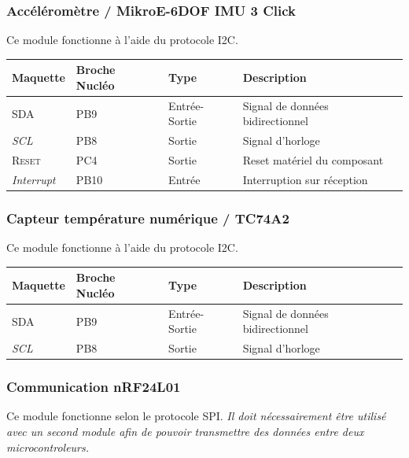 \documentclass[a4paper,11pt,titlepage]{article} %
\begin{document}
\subsubsection{Accéléromètre / MikroE-6DOF IMU 3 Click}

Ce module fonctionne à l'aide du protocole I2C.

\begin{center}
\begin{tabular}{|l|l|l|l|}
\hline 
Maquette & \textbf{Broche Nucléo} & Type & Description \\ 
\hline 
\textsc{SDA} & PB9 & Entrée-Sortie & Signal de données bidirectionnel \\ 
\textit{SCL} & PB8 & Sortie & Signal d'horloge\\
\hline 
\textsc{Reset} & PC4 & Sortie & Reset matériel du composant\\ 
\textit{Interrupt} & PB10 & Entrée & Interruption sur réception\\ 
\hline 
\end{tabular} 
\end{center}

\subsubsection{Capteur température numérique / TC74A2}

Ce module fonctionne à l'aide du protocole I2C.

\begin{center}
\begin{tabular}{|l|l|l|l|}
\hline 
Maquette & \textbf{Broche Nucléo} & Type & Description \\ 
\hline 
\textsc{SDA} & PB9 & Entrée-Sortie & Signal de données bidirectionnel \\ 
\textit{SCL} & PB8 & Sortie & Signal d'horloge\\
\hline 
\end{tabular} 
\end{center}


\subsubsection{Communication nRF24L01}

Ce module fonctionne selon le protocole SPI. \textit{Il doit nécessairement être utilisé avec un second module afin de pouvoir transmettre des données entre deux microcontroleurs.}
\end{document}
